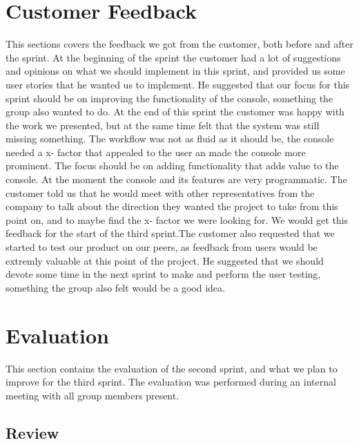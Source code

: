 \section{Customer Feedback}
This sections covers the feedback we got from the customer, both before and after the sprint.
\newline
\newline
At the beginning of the sprint the customer had a lot of suggestions and opinions on what we should implement in this sprint, and provided us some user stories that he wanted us to implement. He suggested that our focus for this sprint should be on improving the functionality of the console, something the group also wanted to do. 
\newline
\newline
At the end of this sprint the customer was happy with the work we presented, but at the same time felt that the system was still missing something. The workflow was not as fluid as it should be, the console needed a x- factor that appealed to the user an made the console more prominent. The focus should be on adding functionality that adds value to the console. At the moment the console and its features are very programmatic. The customer told us that he would meet with other representatives from the company to talk about the direction they wanted the project to take from this point on, and to maybe find the x- factor we were looking for. We would get this feedback for the start of the third sprint.The customer also requested that we started to test our product on our peers, as feedback from users would be extremly valuable at this point of the project. He suggested that we should devote some time in the next sprint to make and perform the user testing, something the group also felt would be a good idea.

\section{Evaluation}
This section contains the evaluation of the second sprint, and what we plan to improve for the third sprint. The evaluation was performed during an internal meeting with all group members present.

\subsection{Review}


